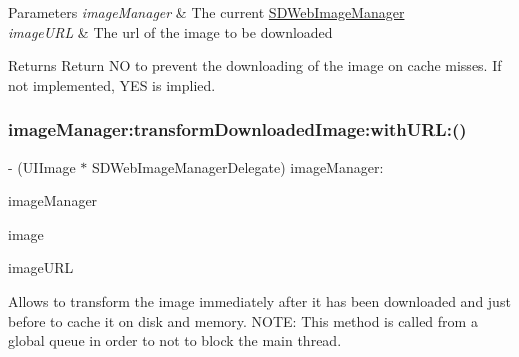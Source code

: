 \begin{DoxyParams}{Parameters}
{\em image\+Manager} & The current {\ttfamily \mbox{\hyperlink{interface_s_d_web_image_manager}{S\+D\+Web\+Image\+Manager}}} \\
\hline
{\em image\+U\+RL} & The url of the image to be downloaded\\
\hline
\end{DoxyParams}
\begin{DoxyReturn}{Returns}
Return NO to prevent the downloading of the image on cache misses. If not implemented, Y\+ES is implied. 
\end{DoxyReturn}
\mbox{\label{protocol_s_d_web_image_manager_delegate_01-p_a6d50b06d616092913f7a99093723638e}} 
\subsubsection{\texorpdfstring{image\+Manager\+:transform\+Downloaded\+Image\+:with\+U\+R\+L\+:()}{imageManager:transformDownloadedImage:withURL:()}\hspace{0.1cm}{\footnotesize\ttfamily [1/3]}}
{\footnotesize\ttfamily -\/ (U\+I\+Image $\ast$ S\+D\+Web\+Image\+Manager\+Delegate) image\+Manager\+: \begin{DoxyParamCaption}\item[{(\mbox{\hyperlink{interface_s_d_web_image_manager}{S\+D\+Web\+Image\+Manager}} $\ast$)}]{image\+Manager }\item[{transformDownloadedImage:(U\+I\+Image $\ast$)}]{image }\item[{withURL:(N\+S\+U\+RL $\ast$)}]{image\+U\+RL }\end{DoxyParamCaption}\hspace{0.3cm}{\ttfamily [optional]}}

Allows to transform the image immediately after it has been downloaded and just before to cache it on disk and memory. N\+O\+TE\+: This method is called from a global queue in order to not to block the main thread.


